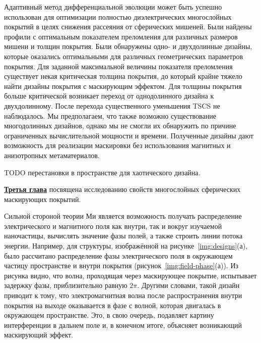 Адаптивный метод дифференциальной эволюции может быть успешно
использован для оптимизации полностью диэлектрических многослойных
покрытий в целях снижения рассеяния от сферических мишеней.  Были
найдены профили с оптимальным показателем преломления для различных
размеров мишени и толщин покрытия.  Были обнаружены одно- и
двухдолинные дизайны, которые оказались оптимальными для различных
геометрических параметров покрытия.  Для заданной максимальной
величины показателя преломления существует некая критическая толщина
покрытия, до который крайне тяжело найти дизайны покрытия с
маскирующим эффектом.  Для толщины покрытия больше критической
возникает переход от однодолинного дизайна к двухдолинному.  После
перехода существенного уменьшения TSCS не наблюдалось.  Мы
предполагаем, что также возможно существование многодолинных дизайнов,
однако мы не смогли их обнаружить по причине ограниченных
вычислительной мощности и времени.  Полученные дизайны дают
возможность для реализации маскировки без использования магнитных и
анизотропных метаматериалов.
   


TODO перестановки в пространстве для хаотического дизайна.

\underline{\textbf{Третья глава}} посвящена исследованию свойств
многослойных сферических маскирующих покрытий.


Сильной стороной теории Ми является возможность получать распределение
электрического и магнитного поля как внутри, так и вокруг изучаемой
наночастицы, вычислять значение фазы полей, а также строить линии
потока энергии.  Например, для структуры, изображённой на
рисунке~\ref{img:designs}(а), было рассчитано распределение фазы
электрического поля в окружающем частицу пространстве и внутри
покрытия (рисунок~\ref{img:field-phase}(а)).  Из рисунка видно, что
волна, проходящая через маскирующее покрытие, испытывает задержку фазы,
приблизительно равную $2\pi$. Другими словами, такой дизайн приводит к
тому, что электромагнитная волна после распространения внутри покрытия
на выходе оказывается в фазе с волной, которая двигалась в окружающем
пространстве.  Это, в свою очередь, подавляет картину интерференции в
дальнем поле и, в конечном итоге, объясняет возникающий маскирующий
эффект.

\clearpage